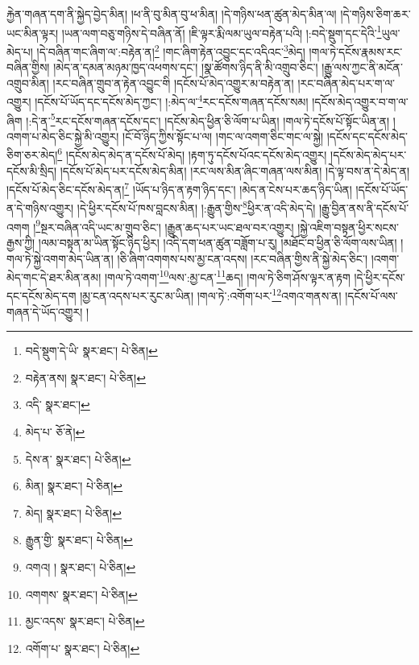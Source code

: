 རྐྱེན་གཞན་དག་ནི་སྐྱེད་བྱེད་མིན། །ཕ་ནི་བུ་མིན་བུ་ཕ་མིན། །དེ་གཉིས་ཕན་ཚུན་མེད་མིན་ལ། །དེ་གཉིས་ཅིག་ཆར་ཡང་མིན་ལྟར། །ཡན་ལག་བཅུ་གཉིས་དེ་བཞིན་ནོ། །ཇི་ལྟར་རྨི་ལམ་ཡུལ་བརྟེན་པའི། །:བདེ་སྡུག་དང་དེའི་\footnote{བདེ་སྡུག་དེ་ཡི་  སྣར་ཐང་།  པེ་ཅིན། }ཡུལ་མེད་པ། །དེ་བཞིན་གང་ཞིག་ལ་:བརྟེན་ན།\footnote{བརྟེན་ནས།  སྣར་ཐང་།  པེ་ཅིན། } །གང་ཞིག་རྟེན་འབྱུང་དང་འདིའང་\footnote{འདི་  སྣར་ཐང་། }མེད། །གལ་ཏེ་དངོས་རྣམས་རང་བཞིན་གྱིས། །མེད་ན་དམན་མཉམ་ཁྱད་འཕགས་དང་། །སྣ་ཚོགས་ཉིད་ནི་མི་འགྲུབ་ཅིང་། །རྒྱུ་ལས་ཀྱང་ནི་མངོན་འགྲུབ་མིན། །རང་བཞིན་གྲུབ་ན་རྟེན་འབྱུང་གི །དངོས་པོ་མེད་འགྱུར་མ་བརྟེན་ན། །རང་བཞིན་མེད་པར་ག་ལ་འགྱུར། །དངོས་པོ་ཡོད་དང་དངོས་མེད་ཀྱང་། །:མེད་ལ་\footnote{མེད་པ་  ཅོ་ནེ། }རང་དངོས་གཞན་དངོས་སམ། །དངོས་མེད་འགྱུར་བ་ག་ལ་ཞིག །:དེ་ན་\footnote{དེས་ན་  སྣར་ཐང་།  པེ་ཅིན། }རང་དངོས་གཞན་དངོས་དང་། །དངོས་མེད་ཕྱིན་ཅི་ལོག་པ་ཡིན། །གལ་ཏེ་དངོས་པོ་སྟོང་ཡིན་ན། །འགག་པ་མེད་ཅིང་སྐྱེ་མི་འགྱུར། །ངོ་བོ་ཉིད་ཀྱིས་སྟོང་པ་ལ། །གང་ལ་འགག་ཅིང་གང་ལ་སྐྱེ། །དངོས་དང་དངོས་མེད་ཅིག་ཅར་མེད།\footnote{མིན།  སྣར་ཐང་།  པེ་ཅིན། } །དངོས་མེད་མེད་ན་དངོས་པོ་མེད། །རྟག་ཏུ་དངོས་པོའང་དངོས་མེད་འགྱུར། །དངོས་མེད་མེད་པར་དངོས་མི་སྲིད། །དངོས་པོ་མེད་པར་དངོས་མེད་མིན། །རང་ལས་མིན་ཞིང་གཞན་ལས་མིན། །དེ་ལྟ་བས་ན་དེ་མེད་ན། །དངོས་པོ་མེད་ཅིང་དངོས་མེད་ན།\footnote{མེད།  སྣར་ཐང་།  པེ་ཅིན། } །ཡོད་པ་ཉིད་ན་རྟག་ཉིད་དང་། །མེད་ན་ངེས་པར་ཆད་ཉིད་ཡིན། །དངོས་པོ་ཡོད་ན་དེ་གཉིས་འགྱུར། །དེ་ཕྱིར་དངོས་པོ་ཁས་བླངས་མིན། །:རྒྱུན་གྱིས་\footnote{རྒྱུན་གྱི་  སྣར་ཐང་།  པེ་ཅིན། }ཕྱིར་ན་འདི་མེད་དེ། །རྒྱུ་བྱིན་ནས་ནི་དངོས་པོ་འགག །\footnote{འགའ། །  སྣར་ཐང་།  པེ་ཅིན། }སྔར་བཞིན་འདི་ཡང་མ་གྲུབ་ཅིང་། །རྒྱུན་ཆད་པར་ཡང་ཐལ་བར་འགྱུར། །སྐྱེ་འཇིག་བསྟན་ཕྱིར་སངས་རྒྱས་ཀྱི། །ལམ་བསྟན་མ་ཡིན་སྟོང་ཉིད་ཕྱིར། །འདི་དག་ཕན་ཚུན་བཟློག་པ་རུ། །མཐོང་བ་ཕྱིན་ཅི་ལོག་ལས་ཡིན། །གལ་ཏེ་སྐྱེ་འགག་མེད་ཡིན་ན། །ཅི་ཞིག་འགགས་པས་མྱ་ངན་འདས། །རང་བཞིན་གྱིས་ནི་སྐྱེ་མེད་ཅིང་། །འགག་མེད་གང་དེ་ཐར་མིན་ནམ། །གལ་ཏེ་འགག་\footnote{འགགས་  སྣར་ཐང་།  པེ་ཅིན། }ལས་:མྱ་ངན་\footnote{མྱང་འདས་  སྣར་ཐང་།  པེ་ཅིན། }ཆད། །གལ་ཏེ་ཅིག་ཤོས་ལྟར་ན་རྟག །དེ་ཕྱིར་དངོས་དང་དངོས་མེད་དག །མྱ་ངན་འདས་པར་རུང་མ་ཡིན། །གལ་ཏེ་:འགོག་པར་\footnote{འགོག་པ་  སྣར་ཐང་།  པེ་ཅིན། }འགའ་གནས་ན། །དངོས་པོ་ལས་གཞན་དེ་ཡོད་འགྱུར། །
